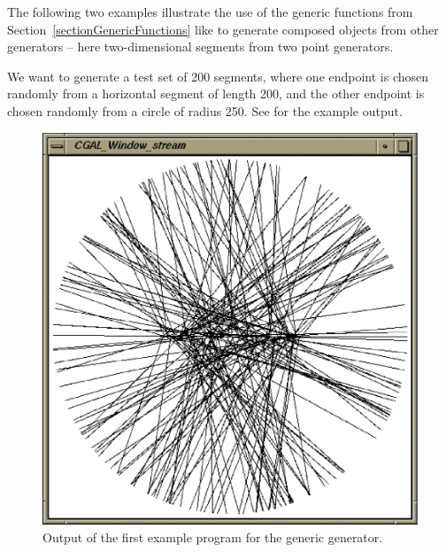 The following two examples illustrate the use of the generic functions
from Section~\ref{sectionGenericFunctions} like
 to generate composed objects from other
generators -- here two-dimensional segments from two point generators.

We want to generate a test set of 200 segments, where one endpoint is
chosen randomly from a horizontal segment of length 200, and the other
endpoint is chosen randomly from a circle of radius 250. See
 for the example
output.

\begin{ccTexOnly}
  \begin{figure}
    \noindent
    \hspace*{0.025\textwidth}%
    \begin{minipage}[t]{0.45\textwidth}%
      \includegraphics[width=\textwidth]{Segment_generator_prog1.ps}
      \caption{Output of the first example program for the generic generator.}
      \label{figureSegmentGenerator}
    \end{minipage}%
    \hspace*{0.05\textwidth}%
    \begin{minipage}[t]{0.45\textwidth}%

\end{minipage}
\end{figure}
\end{ccTexOnly}
